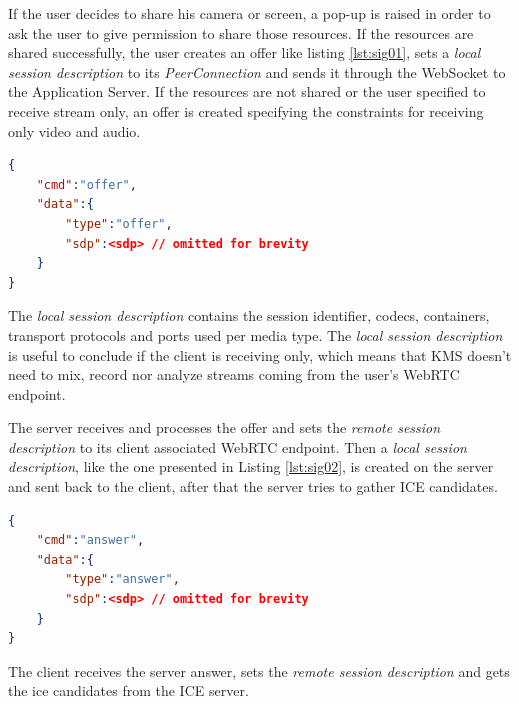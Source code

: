 If the user decides to share his camera or screen, a pop-up is raised in order to ask the user to give permission to share those resources. If the resources are shared successfully, the user creates an offer like listing \ref{lst:sig01}, sets a \emph{local session description} to its \emph{PeerConnection} and sends it through the WebSocket to the Application Server.
If the resources are not shared or the user specified to receive stream only, an offer is created specifying the constraints for receiving only video and audio.

\begin{minipage}{\linewidth}
\begin{lstlisting}[caption={Offer created by client},label={lst:sig01},language=json]
{
	"cmd":"offer",
	"data":{
		"type":"offer",
		"sdp":<sdp>	// omitted for brevity
	}
}
\end{lstlisting}
\end{minipage}

The \emph{local session description} contains the session identifier, codecs, containers, transport protocols and ports used per media type. The \emph{local session description} is useful to conclude if the client is receiving only, which means that \ac{KMS} doesn't need to mix, record nor analyze streams coming from the user's \ac{WebRTC} endpoint. 

The server receives and processes the offer and sets the \emph{remote session description} to its client associated \ac{WebRTC} endpoint. Then a \emph{local session description}, like the one presented in Listing \ref{lst:sig02}, is created on the server and sent back to the client, after that the server tries to gather \ac{ICE} candidates.

\begin{minipage}{\linewidth}
\begin{lstlisting}[caption={Answer created by KMS},label={lst:sig02},language=json]
{
	"cmd":"answer",
	"data":{
		"type":"answer",
		"sdp":<sdp>	// omitted for brevity
	}
}
\end{lstlisting}
\end{minipage}

The client receives the server answer, sets the \emph{remote session description} and gets the ice candidates from the \ac{ICE} server.

